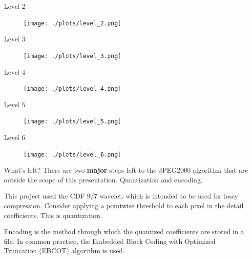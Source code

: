 \documentclass[9pt]{beamer}
\begin{document}
\begin{frame}{Level 2}
	\begin{figure}
		\centering
		\texttt{[image: ./plots/level\_2.png]}
	\end{figure}	
\end{frame}

\begin{frame}{Level 3}
	\begin{figure}
		\centering
		\texttt{[image: ./plots/level\_3.png]}
	\end{figure}
\end{frame}

\begin{frame}{Level 4}
	\begin{figure}
		\centering
		\texttt{[image: ./plots/level\_4.png]}
	\end{figure}
\end{frame}

\begin{frame}{Level 5}
	\begin{figure}
		\centering
		\texttt{[image: ./plots/level\_5.png]}
	\end{figure}
\end{frame}

\begin{frame}{Level 6}
	\begin{figure}
		\centering
		\texttt{[image: ./plots/level\_6.png]}
	\end{figure}
\end{frame}


\begin{frame}{What's left?}
	There are two \textbf{major} steps left to the JPEG2000 algorithm that
	are outside the scope of this presentation. Quantization and encoding.

	\vspace{1cm}

	This project used the CDF 9/7 wavelet, which is intended to be used
	for lossy compression. Consider applying a pointwise threshold to
	each pixel in the detail coefficients. This is quantization.

	\vspace{0.5cm}

	Encoding is the method through which the quantized coefficients are
	stored in a file. In common practice, the Embedded Block Coding with
	Optimized Truncation (EBCOT) algorithm is used.
	
\end{frame}
\end{document}
